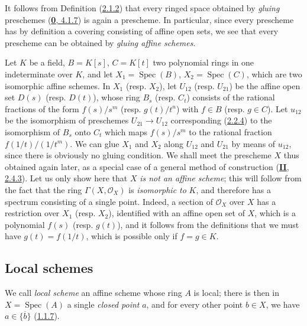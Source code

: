 \begin{env}[2.3.1]
\label{I.2.3.1}
It follows from Definition (\hyperref[I.2.1.2]{2.1.2}) that every ringed
space obtained by \emph{gluing} preschemes
(\hyperref[0.4.1.7]{\textbf{0}, 4.1.7}) is again a prescheme. In particular,
since every prescheme has by definition a covering consisting of affine
open sets, we see that every prescheme can be obtained by
\emph{gluing affine schemes}.
\end{env}

\begin{example}[2.3.2]
\label{I.2.3.2}
Let $K$ be a field, $B=K[s]$, $C=K[t]$ two polynomial rings in one
indeterminate over $K$, and let $X_1=\operatorname{Spec}(B)$,
$X_2=\operatorname{Spec}(C)$, which are two isomorphic affine schemes. In
$X_1$ (resp. $X_2$), let $U_{12}$ (resp. $U_{21}$) be the affine open set
$D(s)$ (resp. $D(t)$), whose ring $B_s$ (resp. $C_t$) consists of the
rational fractions of the form $f(s)/s^m$ (resp. $g(t)/t^n$) with $f\in B$
(resp. $g\in C$). Let $u_{12}$ be the isomorphism of preschemes
$U_{21}\to U_{12}$ corresponding (\hyperref[I.2.2.4]{2.2.4}) to
the isomorphism of $B_s$ onto $C_t$ which maps $f(s)/s^m$ to the rational
fraction $f(1/t)/(1/t^m)$. We can glue $X_1$ and $X_2$ along
$U_{12}$ and $U_{21}$ by means of $u_{12}$, since there is obviously no
gluing condition. We shall meet the prescheme $X$ thus obtained again later,
as a special case of a general method of construction
(\hyperref[II.2.4.3]{\textbf{II}, 2.4.3}). Let us only show here that $X$
\emph{is not an affine scheme}; this will follow from the fact that the ring
$\Gamma(X,\mathscr{O}_X)$ is \emph{isomorphic to} $K$, and therefore has a
spectrum consisting of a single point. Indeed, a section of $\mathscr{O}_X$
over $X$ has a restriction over $X_1$ (resp. $X_2$), identified with an
affine open set of $X$, which is a polynomial $f(s)$ (resp. $g(t)$), and it
follows from the definitions that we must have $g(t)=f(1/t)$, which is
possible only if $f=g\in K$.
\end{example}

\subsection{Local schemes}
\label{subsection:I.2.4}

\begin{env}[2.4.1]
\label{I.2.4.1}
We call \emph{local scheme} an affine scheme whose ring $A$ is local;
there is then in $X=\operatorname{Spec}(A)$ a single \emph{closed point}
$a$, and for every other point $b\in X$, we have
$a\in\overline{\{b\}}$ (\hyperref[I.1.1.7]{1.1.7}).
\end{env}


